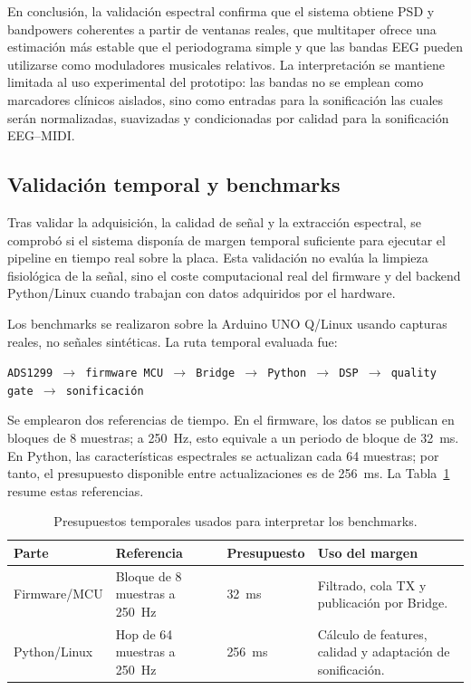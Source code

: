 \documentclass[../main.tex]{subfiles}
\begin{document}
En conclusión, la validación espectral confirma que el sistema obtiene PSD y bandpowers coherentes a partir de ventanas reales, que multitaper ofrece una estimación más estable que el periodograma simple y que las bandas EEG pueden utilizarse como moduladores musicales relativos. La interpretación se mantiene limitada al uso experimental del prototipo: las bandas no se emplean como marcadores clínicos aislados, sino como entradas para la sonificación las cuales serán normalizadas, suavizadas y condicionadas por calidad para la sonificación EEG--MIDI.

\subsection{Validación temporal y benchmarks}
\label{subsec:validacion_benchmarks}

Tras validar la adquisición, la calidad de señal y la extracción espectral, se comprobó si el sistema disponía de margen temporal suficiente para ejecutar el pipeline en tiempo real sobre la placa. Esta validación no evalúa la limpieza fisiológica de la señal, sino el coste computacional real del firmware y del backend Python/Linux cuando trabajan con datos adquiridos por el hardware.

Los benchmarks se realizaron sobre la Arduino UNO Q/Linux usando capturas reales, no señales sintéticas. La ruta temporal evaluada fue:

\begin{center}
\texttt{ADS1299 $\rightarrow$ firmware MCU $\rightarrow$ Bridge $\rightarrow$ Python $\rightarrow$ DSP $\rightarrow$ quality gate $\rightarrow$ sonificación}
\end{center}

Se emplearon dos referencias de tiempo. En el firmware, los datos se publican en bloques de 8 muestras; a \SI{250}{\hertz}, esto equivale a un periodo de bloque de \SI{32}{\milli\second}. En Python, las características espectrales se actualizan cada 64 muestras; por tanto, el presupuesto disponible entre actualizaciones es de \SI{256}{\milli\second}. La Tabla~\ref{tab:validacion_presupuestos_temporales} resume estas referencias.

\begin{table}[htbp]
\centering
\caption{Presupuestos temporales usados para interpretar los benchmarks.}
\label{tab:validacion_presupuestos_temporales}
\begin{tabular}{p{} p{} p{} p{}}
\hline
\textbf{Parte} & \textbf{Referencia} & \textbf{Presupuesto} & \textbf{Uso del margen} \\
\hline
Firmware/MCU & Bloque de 8 muestras a \SI{250}{\hertz} & \SI{32}{\milli\second} & Filtrado, cola TX y publicación por Bridge. \\
Python/Linux & Hop de 64 muestras a \SI{250}{\hertz} & \SI{256}{\milli\second} & Cálculo de features, calidad y adaptación de sonificación. \\
\hline
\end{tabular}
\end{table}
\end{document}

